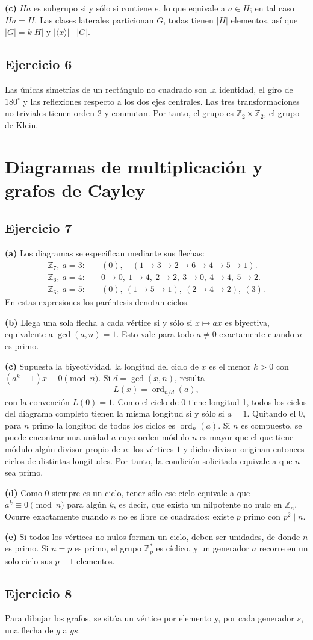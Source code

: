 \documentclass[11pt,a4paper]{article}
\newcommand{\Z}{\mathbb Z}
\newcommand{\ej}[1]{\subsection*{Ejercicio #1}}
\begin{document}
\textbf{(c)} $Ha$ es subgrupo si y sólo si contiene $e$, lo que equivale a $a\in H$; en tal caso $Ha=H$. Las clases laterales particionan $G$, todas tienen $|H|$ elementos, así que $|G|=k|H|$ y $|\langle x\rangle|\mid |G|$.
\ej{6}
Las únicas simetrías de un rectángulo no cuadrado son la identidad, el giro de $180^\circ$ y las reflexiones respecto a los dos ejes centrales. Las tres transformaciones no triviales tienen orden 2 y conmutan. Por tanto, el grupo es $\Z_2\times\Z_2$, el grupo de Klein.
\section{Diagramas de multiplicación y grafos de Cayley}
\ej{7}
\textbf{(a)} Los diagramas se especifican mediante sus flechas:
\begin{align*}
\Z_7,\ a=3:&\quad (0),\quad(1\to3\to2\to6\to4\to5\to1).\\
\Z_6,\ a=4:&\quad 0\to0,\ 1\to4,\ 2\to2,\ 3\to0,\ 4\to4,\ 5\to2.\\
\Z_6,\ a=5:&\quad (0),\ (1\to5\to1),\ (2\to4\to2),\ (3).
\end{align*}
En estas expresiones los paréntesis denotan ciclos.

\textbf{(b)} Llega una sola flecha a cada vértice si y sólo si $x\mapsto ax$ es biyectiva, equivalente a $\gcd(a,n)=1$. Esto vale para todo $a\neq0$ exactamente cuando $n$ es primo.

\textbf{(c)} Supuesta la biyectividad, la longitud del ciclo de $x$ es el menor $k>0$ con $(a^k-1)x\equiv0\pmod n$. Si $d=\gcd(x,n)$, resulta
\[L(x)=\operatorname{ord}_{n/d}(a),\]
con la convención $L(0)=1$. Como el ciclo de 0 tiene longitud 1, todos los ciclos del diagrama completo tienen la misma longitud si y sólo si $a=1$. Quitando el 0, para $n$ primo la longitud de todos los ciclos es $\operatorname{ord}_n(a)$. Si $n$ es compuesto, se puede encontrar una unidad $a$ cuyo orden módulo $n$ es mayor que el que tiene módulo algún divisor propio de $n$: los vértices $1$ y dicho divisor originan entonces ciclos de distintas longitudes. Por tanto, la condición solicitada equivale a que $n$ sea primo.

\textbf{(d)} Como $0$ siempre es un ciclo, tener sólo ese ciclo equivale a que $a^k\equiv0\pmod n$ para algún $k$, es decir, que exista un nilpotente no nulo en $\Z_n$. Ocurre exactamente cuando $n$ no es libre de cuadrados: existe $p$ primo con $p^2\mid n$.

\textbf{(e)} Si todos los vértices no nulos forman un ciclo, deben ser unidades, de donde $n$ es primo. Si $n=p$ es primo, el grupo $\Z_p^*$ es cíclico, y un generador $a$ recorre en un solo ciclo sus $p-1$ elementos.
\ej{8}
Para dibujar los grafos, se sitúa un vértice por elemento y, por cada generador $s$, una flecha de $g$ a $gs$.
\end{document}
